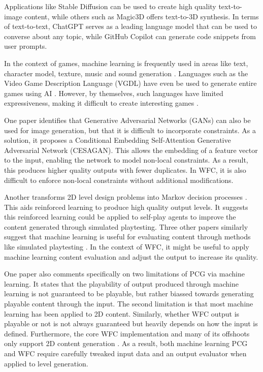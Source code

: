 Applications like Stable Diffusion \cite{Stable_Diffusion} can be used to create high quality text-to-image content, while others such as Magic3D \cite{Magic3D} offers text-to-3D synthesis. In terms of text-to-text, ChatGPT \cite{Chat_GPT} serves as a leading language model that can be used to converse about any topic, while GitHub Copilot \cite{GitHub_Copilot} can generate code snippets from user prompts.

In the context of games, machine learning is frequently used in areas like text, character model, texture, music and sound generation \cite{DeepLearningPCG}. Languages such as the Video Game Description Language (VGDL) have even be used to generate entire games using AI \cite{VGDL, VGDL_ASP}. However, by themselves, such languages have limited expressiveness, making it difficult to create interesting games \cite{VGDL}.

One paper \cite{CESAGAN} identifies that Generative Adversarial Networks (GANs) can also be used for image generation, but that it is difficult to incorporate constraints. As a solution, it proposes a Conditional Embedding Self-Attention Generative Adversarial Network (CESAGAN). This allows the embedding of a feature vector to the input, enabling the network to model non-local constraints. As a result, this produces higher quality outputs with fewer duplicates. In WFC, it is also difficult to enforce non-local constraints without additional modifications.

Another transforms 2D level design problems into Markov decision processes \cite{Markov_PCGRL}. This aids reinforced learning to produce high quality output levels. It suggests this reinforced learning could be applied to self-play agents to improve the content generated through simulated playtesting. Three other papers similarly suggest that machine learning is useful for evaluating content through methods like simulated playtesting \cite{DeepLearningPCG, VGDL_ASP, PCGML}. In the context of WFC, it might be useful to apply machine learning content evaluation and adjust the output to increase its quality.

One paper \cite{PCGML} also comments specifically on two limitations of PCG via machine learning. It states that the playability of output produced through machine learning is not guaranteed to be playable, but rather biassed towards generating playable content through the input. The second limitation is that most machine learning has been applied to 2D content. Similarly, whether WFC output is playable or not is not always guaranteed but heavily depends on how the input is defined. Furthermore, the core WFC implementation and many of its offshoots only support 2D content generation \cite{Gumin_Wave_Function_Collapse_2016}. As a result, both machine learning PCG and WFC require carefully tweaked input data and an output evaluator when applied to level generation.

